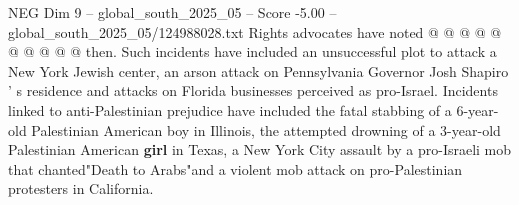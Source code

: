 \begin{textsample}{NEG Dim 9 – global\_south\_2025\_05 – Score -5.00 – global\_south\_2025\_05/124988028.txt}
Rights advocates have noted @ @ @ @ @ @ @ @ @ @ then.
Such incidents have included an unsuccessful plot to attack a New York Jewish center, an arson attack on Pennsylvania Governor Josh Shapiro ' s residence and attacks on Florida businesses perceived as pro-Israel.
Incidents linked to anti-Palestinian prejudice have included the fatal stabbing of a 6-year-old Palestinian American boy in Illinois, the attempted drowning of a 3-year-old Palestinian American \textbf{girl} in Texas, a New York City assault by a pro-Israeli mob that chanted"Death to Arabs"and a violent mob attack on pro-Palestinian protesters in California.

\end{textsample}
